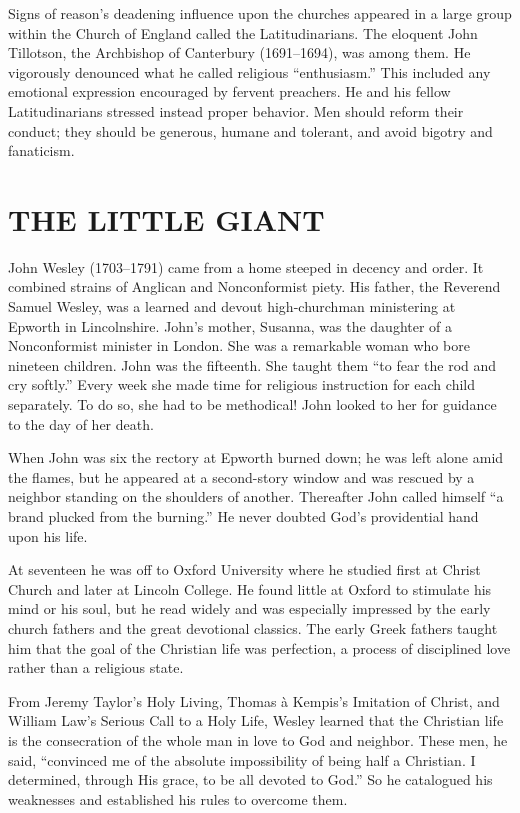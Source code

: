 Signs of reason’s deadening influence upon the churches appeared in a large group within the Church
of England called the Latitudinarians. The eloquent John Tillotson, the Archbishop of Canterbury
(1691–1694), was among them. He vigorously denounced what he called religious “enthusiasm.” This
included any emotional expression encouraged by fervent preachers. He and his fellow Latitudinarians
stressed instead proper behavior. Men should reform their conduct; they should be generous, humane
and tolerant, and avoid bigotry and fanaticism.

\section{THE LITTLE GIANT}

John Wesley (1703–1791) came from a home steeped in decency and order. It combined strains of
Anglican and Nonconformist piety. His father, the Reverend Samuel Wesley, was a learned and devout
high-churchman ministering at Epworth in Lincolnshire. John’s mother, Susanna, was the daughter of a
Nonconformist minister in London. She was a remarkable woman who bore nineteen children. John was
the fifteenth. She taught them “to fear the rod and cry softly.” Every week she made time for
religious instruction for each child separately. To do so, she had to be methodical! John looked to
her for guidance to the day of her death.

When John was six the rectory at Epworth burned down; he was left alone amid the flames, but he
appeared at a second-story window and was rescued by a neighbor standing on the shoulders of
another. Thereafter John called himself “a brand plucked from the burning.” He never doubted God’s
providential hand upon his life.

At seventeen he was off to Oxford University where he studied first at Christ Church and later at
Lincoln College. He found little at Oxford to stimulate his mind or his soul, but he read widely and
was especially impressed by the early church fathers and the great devotional classics. The early
Greek fathers taught him that the goal of the Christian life was perfection, a process of
disciplined love rather than a religious state.

From Jeremy Taylor’s Holy Living, Thomas à Kempis’s Imitation of Christ, and William Law’s Serious
Call to a Holy Life, Wesley learned that the Christian life is the consecration of the whole man in
love to God and neighbor. These men, he said, “convinced me of the absolute impossibility of being
half a Christian. I determined, through His grace, to be all devoted to God.” So he catalogued his
weaknesses and established his rules to overcome them.

